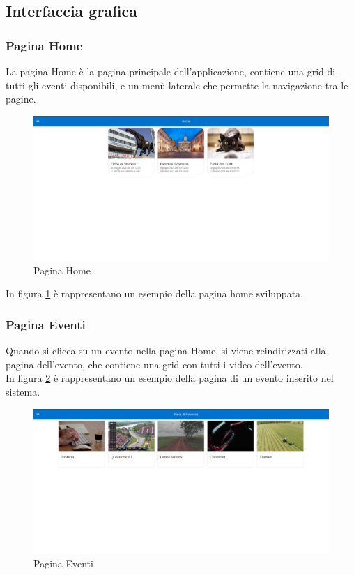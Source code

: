 \subsection{Interfaccia grafica}
\subsubsection{Pagina Home}
La pagina Home è la pagina principale dell'applicazione, contiene una grid di tutti gli eventi disponibili, e un menù laterale che permette la navigazione tra le pagine.\\
\begin{figure}[H]
    \centering
    \includegraphics[width=1\textwidth]{images/interface/home.png}
    \caption{Pagina Home}
    \label{fig:home}
\end{figure}
In figura \ref{fig:home} è rappresentano un esempio della pagina home sviluppata.
\subsubsection{Pagina Eventi}
Quando si clicca su un evento nella pagina Home, si viene reindirizzati alla pagina dell'evento, che contiene una grid con tutti i video dell'evento.\\
In figura \ref{fig:eventi} è rappresentano un esempio della pagina di un evento inserito nel sistema.
\begin{figure}[H]
    \centering
    \includegraphics[width=1\textwidth]{images/interface/events.png}
    \caption{Pagina Eventi}
    \label{fig:eventi}
\end{figure}
